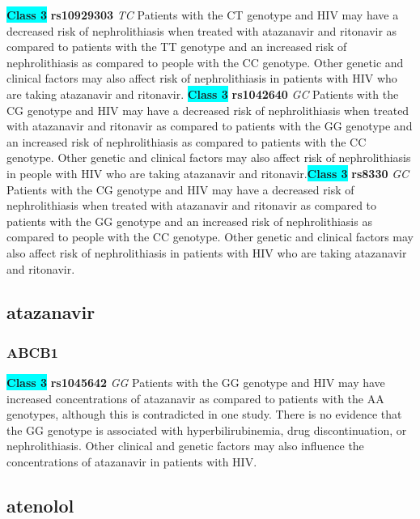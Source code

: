 \documentclass{book}
\begin{document}
\begin{center}
\textbf{\colorbox{cyan} {Class 3}} \textbf{ rs10929303 } \textit{ TC }
Patients with the CT genotype and HIV may have a decreased risk of nephrolithiasis when treated with atazanavir and ritonavir as compared to patients with the TT genotype and an increased risk of nephrolithiasis as compared to people with the CC genotype. Other genetic and clinical factors may also affect risk of nephrolithiasis in patients with HIV who are taking atazanavir and ritonavir. \textbf{\colorbox{cyan} {Class 3}} \textbf{ rs1042640 } \textit{ GC }
Patients with the CG genotype and HIV may have a decreased risk of nephrolithiasis when treated with atazanavir and ritonavir as compared to patients with the GG genotype and an increased risk of nephrolithiasis as compared to patients with the CC genotype. Other genetic and clinical factors may also affect risk of nephrolithiasis in people with HIV who are taking atazanavir and ritonavir.\textbf{\colorbox{cyan} {Class 3}} \textbf{ rs8330 } \textit{ GC }
Patients with the CG genotype and HIV may have a decreased risk of nephrolithiasis when treated with atazanavir and ritonavir as compared to patients with the GG genotype and an increased risk of nephrolithiasis as compared to people with the CC genotype. Other genetic and clinical factors may also affect risk of nephrolithiasis in patients with HIV who are taking atazanavir and ritonavir.


\end{center}\subsection{ atazanavir }


\subsubsection{ ABCB1 }

\begin{center}
\textbf{\colorbox{cyan} {Class 3}} \textbf{ rs1045642 } \textit{ GG }
Patients with the GG genotype and HIV may have increased concentrations of atazanavir as compared to patients with the AA genotypes, although this is contradicted in one study. There is no evidence that the GG genotype is associated with hyperbilirubinemia, drug discontinuation, or nephrolithiasis.  Other clinical and genetic factors may also influence the concentrations of atazanavir in patients with HIV. 


\end{center}\subsection{ atenolol }
\end{document}
